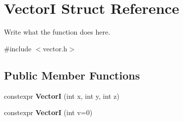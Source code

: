 \hypertarget{structVectorI}{\section{Vector\+I Struct Reference}
\label{structVectorI}
}


Write what the function does here.  




{\ttfamily \#include $<$vector.\+h$>$}

\subsection*{Public Member Functions}
\begin{DoxyCompactItemize}
\item 
\hypertarget{structVectorI_a989706d00480783979c9ff9c34461c5e}{constexpr {\bfseries Vector\+I} (int x, int y, int z)}\label{structVectorI_a989706d00480783979c9ff9c34461c5e}

\item 
\hypertarget{structVectorI_a34dfea0ceb94bb4d4640037c5e1c84b7}{constexpr {\bfseries Vector\+I} (int v=0)}\label{structVectorI_a34dfea0ceb94bb4d4640037c5e1c84b7}


\end{DoxyCompactItemize}

